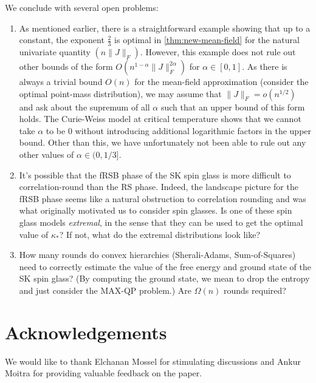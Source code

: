\documentclass[11pt, oneside, english]{article}
\theoremstyle{definition}
\theoremstyle{plain}
\begin{document}
We conclude with several open problems:
\begin{enumerate}
\item As mentioned earlier, there is a straightforward example showing that up to a constant, the exponent $\frac{2}{3}$ is optimal in \cref{thm:new-mean-field} for the natural univariate quantity $(n\|J\|_F)$. However, this example does not rule out other bounds of the form $O(n^{1-\alpha}\|J\|^{2\alpha}_F)$ for $\alpha \in [0,1]$. As there is always a trivial bound $O(n)$ for the mean-field approximation (consider the optimal point-mass distribution), we may assume that $\|J\|_F = o(n^{1/2})$ and ask about the supremum of all $\alpha$ such that an upper bound of this form holds. The Curie-Weiss model at critical temperature shows that we cannot take $\alpha$ to be $0$ without introducing additional logarithmic factors in the upper bound. Other than this, we have unfortunately not been able to rule out any other values of $\alpha \in (0,1/3]$. 

\item It's possible that the fRSB phase of the SK spin glass is more difficult to correlation-round than the RS phase. Indeed, the landscape picture for the fRSB phase seems like a natural obstruction to correlation rounding and was what originally motivated us to consider spin glasses. Is one of these spin glass models \emph{extremal}, in the sense that they can be used to get the optimal value of $\kappa_*$? If not, what do the extremal distributions look like? 
\item How many rounds do convex hierarchies (Sherali-Adams, Sum-of-Squares) need to correctly estimate the value of the free energy and ground state of the SK spin glass? (By computing the ground state, we mean to drop the entropy and just consider the MAX-QP problem.) Are $\Omega(n)$ rounds required?

\end{enumerate}

\section{Acknowledgements}
We would like to thank Elchanan Mossel for stimulating discussions and Ankur Moitra for providing valuable feedback on the paper. 


\appendix
\end{document}
